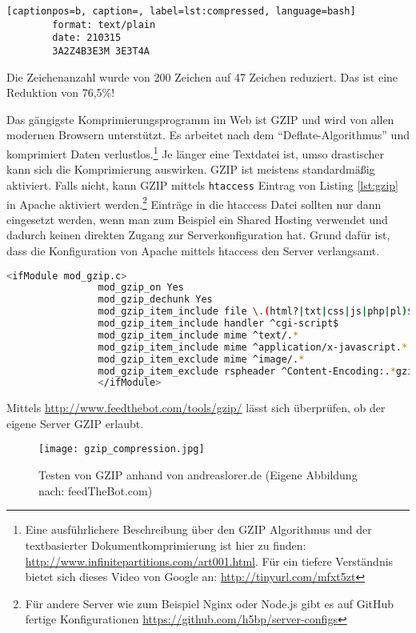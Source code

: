 				\begin{lstlisting}[captionpos=b, caption=, label=lst:compressed, language=bash]
		format: text/plain
		date: 210315
		3A2Z4B3E3M 3E3T4A
				\end{lstlisting}

				Die Zeichenanzahl wurde von 200 Zeichen auf 47 Zeichen reduziert. Das ist eine Reduktion von 76,5\%!			

				Das gängigste Komprimierungsprogramm im Web ist GZIP und wird von allen modernen Browsern unterstützt. Es arbeitet nach dem "`Deflate-Algorithmus"' und komprimiert Daten verlustlos.\footnote{Eine ausführlichere Beschreibung über den GZIP Algorithmus und der textbasierter Dokumentkomprimierung ist hier zu finden: \url{http://www.infinitepartitions.com/art001.html}. Für ein tiefere Verständnis bietet sich dieses Video von Google an: \url{http://tinyurl.com/mfxt5zt}} Je länger eine Textdatei ist, umso drastischer kann sich die Komprimierung auswirken. GZIP ist meistens standardmäßig aktiviert. Falls nicht, kann GZIP mittels \texttt{htaccess} Eintrag von Listing \ref{lst:gzip} in Apache aktiviert werden.\footnote{Für andere Server wie zum Beispiel Nginx oder Node.js gibt es auf GitHub fertige Konfigurationen \url{https://github.com/h5bp/server-configs}} Einträge in die htaccess Datei sollten nur dann eingesetzt werden, wenn man zum Beispiel ein Shared Hosting verwendet und dadurch keinen direkten Zugang zur Serverkonfiguration hat. Grund dafür ist, dass die Konfiguration von Apache mittels htaccess den Server verlangsamt.\autocite{apache}

				\begin{lstlisting}[captionpos=b, caption=GZIP htaccess Eintrag, label=lst:gzip, language=bash]
				<ifModule mod_gzip.c>
				mod_gzip_on Yes
				mod_gzip_dechunk Yes
				mod_gzip_item_include file \.(html?|txt|css|js|php|pl)$
				mod_gzip_item_include handler ^cgi-script$
				mod_gzip_item_include mime ^text/.*
				mod_gzip_item_include mime ^application/x-javascript.*
				mod_gzip_item_exclude mime ^image/.*
				mod_gzip_item_exclude rspheader ^Content-Encoding:.*gzip.*
				</ifModule>
				\end{lstlisting}

				Mittels \url{http://www.feedthebot.com/tools/gzip/} lässt sich überprüfen, ob der eigene Server GZIP erlaubt.

				\begin{figure}[htbp]
					\begin{center}
						\texttt{[image: gzip\_compression.jpg]}
						\caption{Testen von GZIP anhand von andreaslorer.de (Eigene Abbildung nach: feedTheBot.com)}
						\label{fig:gzip_compression}
					\end{center}
				\end{figure}


